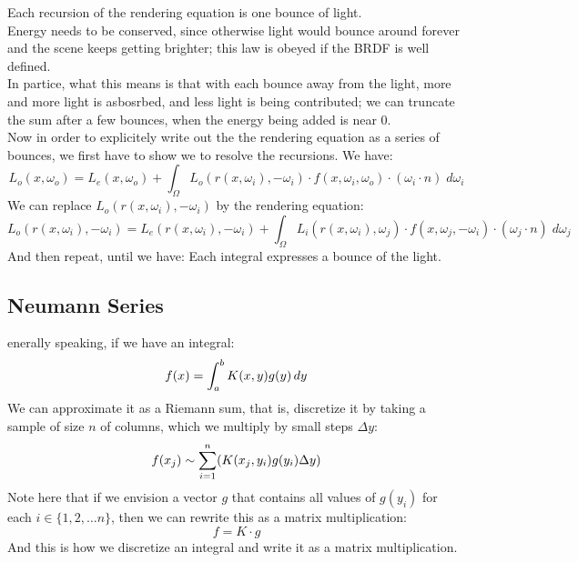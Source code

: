 \documentclass[12pt]{article}
\begin{document}
Each recursion of the rendering equation
is one bounce of light. \\
Energy needs to be conserved, since otherwise light would
bounce around forever and the scene keeps getting brighter;
this law is obeyed if the BRDF is well defined. \\
In partice, what this means is that with each bounce
away from the light, more and more light is asbosrbed,
and less light is being contributed; we can truncate
the sum after a few bounces, when the energy being
added is near $0$. \\

Now in order to explicitely write out the the rendering
equation as a series of bounces, we first have to
show we to resolve the recursions.
We have:
\[ L_{o}(x, \omega_o)
= L_{e}(x, \omega_o)
+ \int_\Omega L_o(r(x, \omega_i), -\omega_i)  \cdot
f(x, \omega_i, \omega_o) \cdot
(\omega_i \cdot n) \; d\omega_i \]
We can replace $L_o(r(x, \omega_i), -\omega_i)$
by the rendering equation:
\[ L_o(r(x, \omega_i), -\omega_i)
= L_{e}(r(x, \omega_i), -\omega_i)
+ \int_\Omega L_i(r(x, \omega_i), \omega_j) \cdot
f(x, \omega_j, -\omega_i) \cdot
(\omega_j \cdot n) \; d\omega_j \]
And then repeat, until we have:
Each integral expresses a bounce of the light. \\

\newpage

\subsection*{Neumann Series}

enerally speaking, if we have an integral:
\[ f(x) = \int_{a}^{b} K(x, y)g(y) \, dy \]
We can approximate it as a Riemann sum,
that is, discretize it
by taking a sample of size $n$ of columns,
which we multiply by small steps $\Delta y$:
\[ f(x_j) \sim \sum_{i = 1}^{n} (K(x_j, y_i)g(y_i) \Delta y) \]
Note here that if we envision
a vector $g$ that contains all values of $g(y_i)$
for each $i \in \{1, 2, \dots n\}$,
then we can rewrite this as a matrix multiplication:
\[ f = K \cdot g \]
And this is how we discretize an integral and write
it as a matrix multiplication. \\
\end{document}
